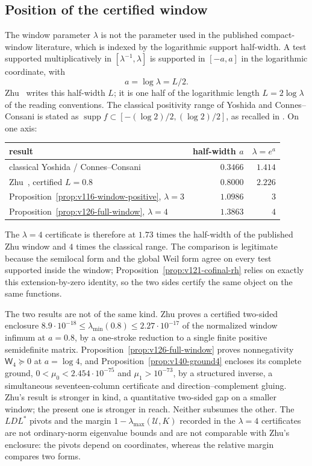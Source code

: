 \documentclass[11pt]{article}
\theoremstyle{remark}
\begin{document}
\subsection*{Position of the certified window}
\label{sec:v141-window-position}
The window parameter $\lambda$ is not the parameter used in the
published compact-window literature, which is indexed by the
logarithmic support half-width. A test supported multiplicatively in
$[\lambda^{-1},\lambda]$ is supported in $[-a,a]$ in the logarithmic
coordinate, with
\[
 a=\log\lambda=L/2 .
\]
Zhu~\cite{Zhu2026} writes this half-width $L$; it is one half of the
logarithmic length $L=2\log\lambda$ of the reading conventions. The
classical positivity range of Yoshida and Connes--Consani is stated
as $\operatorname{supp}f\subset[-(\log2)/2,(\log2)/2]$, as recalled in
\cite{Zhu2026}. On one axis:
\begin{center}
\begin{tabular}{lrr}
\toprule
result & half-width $a$ & $\lambda=e^{a}$\\
\midrule
classical Yoshida / Connes--Consani & $0.3466$ & $1.414$\\
Zhu~\cite{Zhu2026}, certified $L=0.8$ & $0.8000$ & $2.226$\\
Proposition~\ref{prop:v116-window-positive}, $\lambda=3$ & $1.0986$ & $3$\\
Proposition~\ref{prop:v126-full-window}, $\lambda=4$ & $1.3863$ & $4$\\
\bottomrule
\end{tabular}
\end{center}
The $\lambda=4$ certificate is therefore at $1.73$ times the
half-width of the published Zhu window and $4$ times the classical
range. The comparison is legitimate because the semilocal form and the
global Weil form agree on every test supported inside the window;
Proposition~\ref{prop:v121-cofinal-rh} relies on exactly this
extension-by-zero identity, so the two sides certify the same object
on the same functions.

The two results are not of the same kind. Zhu proves a certified
two-sided enclosure
$8.9\cdot10^{-18}\le\lambda_{\min}(0.8)\le2.27\cdot10^{-17}$ of the
normalized window infimum at $a=0.8$, by a one-stroke reduction to a
single finite positive semidefinite matrix.
Proposition~\ref{prop:v126-full-window} proves nonnegativity
$\mathsf W_4\succeq0$ at $a=\log4$, and
Proposition~\ref{prop:v140-ground4} encloses its complete ground,
$0<\mu_0<2.454\cdot10^{-75}$ and $\mu_1>10^{-73}$, by a structured
inverse, a simultaneous seventeen-column certificate and
direction--complement gluing. Zhu's result is stronger in kind, a
quantitative two-sided gap on a smaller window; the present one is
stronger in reach. Neither subsumes the other. The $LDL^*$ pivots and
the margin $1-\lambda_{\max}(\mathcal U,K)$ recorded in the
$\lambda=4$ certificates are not ordinary-norm eigenvalue bounds and are not comparable with
Zhu's enclosure: the pivots depend on coordinates, whereas the relative
margin compares two forms.
\end{document}
